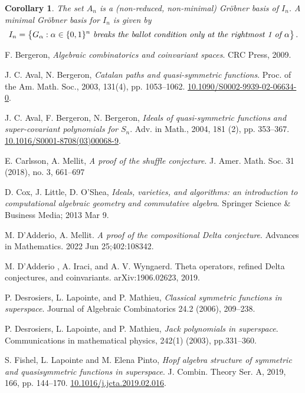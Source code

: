 \documentclass[11pt]{amsart}
\newtheorem{cor}[theorem]{Corollary}
\theoremstyle{definition}
\numberwithin{equation}{section}
\begin{document}
\begin{cor}\label{cor:minimalGB}
The set $A_n$ is a (non-reduced, non-minimal) Gr\"obner basis of $I_n$. A minimal Gr\"obner basis for $I_n$ is given by
$$ I_n =\big\{ G_\alpha : \alpha \in \{0,1\}^n \text{ \it breaks the ballot condition only
at the rightmost  1 of }  \alpha\big\}\,.
$$
\end{cor}


\vskip 1in

\begin{thebibliography}{999}

 F. Bergeron,
\textit{Algebraic combinatorics and coinvariant spaces}.
CRC Press, 2009.

 J. C. Aval, N. Bergeron,
\textit{Catalan paths and quasi-symmetric functions}.
Proc. of the Am. Math. Soc., 2003, 131(4), pp. 1053--1062.
\href{https://doi.org/10.1090/S0002-9939-02-06634-0}{10.1090/S0002-9939-02-06634-0}.

 J. C. Aval, F. Bergeron, N. Bergeron,
\textit{Ideals of quasi-symmetric functions and super-covariant polynomials for $S_n$}.
Adv. in Math., 2004, 181 (2), pp. 353--367.
\href{https://doi.org/10.1016/S0001-8708(03)00068-9}{10.1016/S0001-8708(03)00068-9}.

 E. Carlsson, A. Mellit,
\textit{A proof of the shuffle conjecture}.
J. Amer. Math. Soc. 31 (2018), no. 3, 661–697

 D. Cox, J. Little, D. O'Shea,
\textit{Ideals, varieties, and algorithms: an introduction to computational
algebraic geometry and commutative algebra}.
Springer Science \& Business Media; 2013 Mar 9.

 M. D'Adderio, A. Mellit.
\textit{A proof of the compositional Delta conjecture}.
Advances in Mathematics. 2022 Jun 25;402:108342.

 M. D'Adderio , A. Iraci, and A. V. Wyngaerd.
Theta operators, refined Delta conjectures, and
coinvariants. arXiv:1906.02623, 2019.

 P. Desrosiers, L. Lapointe, and P. Mathieu,
\textit{Classical symmetric functions in superspace}.
Journal of Algebraic Combinatorics 24.2 (2006), 209--238.

 P. Desrosiers, L. Lapointe, and P. Mathieu,
\textit{Jack polynomials in superspace}.
Communications in mathematical physics, 242(1) (2003), pp.331--360.

S. Fishel, L. Lapointe and M. Elena Pinto,
\textit{Hopf algebra structure of symmetric and quasisymmetric
              functions in superspace}.
 {J. Combin. Theory Ser. A}, 2019, 166, pp.  {144--170}.
\href{https://doi-org/10.1016/j.jcta.2019.02.016}{10.1016/j.jcta.2019.02.016}.


\end{thebibliography}
\end{document}
